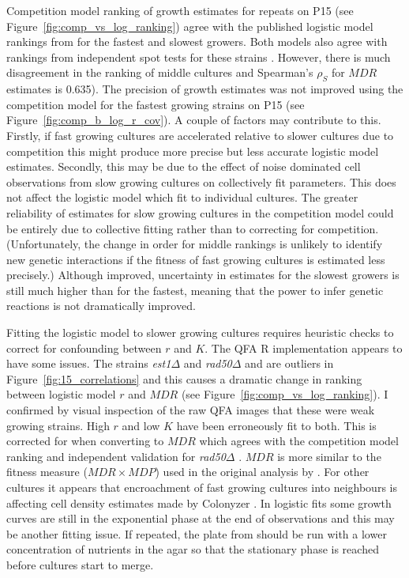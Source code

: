 Competition model ranking of growth estimates for repeats on P15 (see
Figure~\ref{fig:comp_vs_log_ranking}) agree with the published
logistic model rankings from \citet{Addinall2011} for the fastest and
slowest growers. Both models also agree with rankings from independent
spot tests for these strains
\citep{maringele2002exo1,zubko2004exo1,Holstein20141259,foster2006mrx}. However,
there is much disagreement in the ranking of middle cultures and
Spearman's \(\rho_{S}\) for \(MDR\) estimates is 0.635). The precision
of growth estimates was not improved using the competition model for
the fastest growing strains on P15 (see
Figure~\ref{fig:comp_b_log_r_cov}). A couple of factors may contribute
to this. Firstly, if fast growing cultures are accelerated relative to
slower cultures due to competition this might produce more precise but
less accurate logistic model estimates. Secondly, this may be due to
the effect of noise dominated cell observations from slow growing
cultures on collectively fit parameters. This does not affect the
logistic model which fit to individual cultures. The greater
reliability of estimates for slow growing cultures in the competition
model could be entirely due to collective fitting rather than to
correcting for competition. (Unfortunately, the change in order for
middle rankings is unlikely to identify new genetic interactions if
the fitness of fast growing cultures is estimated less precisely.)
Although improved, uncertainty in estimates for the slowest growers is
still much higher than for the fastest, meaning that the power to
infer genetic reactions is not dramatically improved.

Fitting the logistic model to slower growing cultures requires
heuristic checks to correct for confounding between \(r\) and
\(K\). The QFA R implementation appears to have some issues. The
strains \textit{est1\(\Delta\)} and \textit{rad50\(\Delta\)} and are
outliers in Figure~\ref{fig:15_correlations} and this causes a
dramatic change in ranking between logistic model \(r\) and \(MDR\)
(see Figure~\ref{fig:comp_vs_log_ranking}). I confirmed by visual
inspection of the raw QFA images that these were weak growing
strains. High \(r\) and low \(K\) have been erroneously fit to
both. This is corrected for when converting to \(MDR\) which agrees
with the competition model ranking and independent validation for
\textit{rad50\(\Delta\)} \citep{zubko2004exo1}. \(MDR\) is more
similar to the fitness measure (\(MDR \times MDP\)) used in the
original analysis by \citet{Addinall2011}. For other cultures it
appears that encroachment of fast growing cultures into neighbours is
affecting cell density estimates made by Colonyzer
\citep{Lawless2010}. In logistic fits some growth curves are still in
the exponential phase at the end of observations and this may be
another fitting issue. If repeated, the plate from
\citet{Addinall2011} should be run with a lower concentration of
nutrients in the agar so that the stationary phase is reached before
cultures start to merge.

